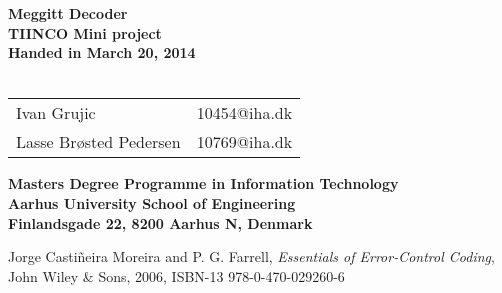 \documentclass[a4paper,10pt]{report}
\begin{document}

\begin{titlepage}
\begin{center}
{\LARGE \textbf{Meggitt Decoder}}\\
{\large \textbf{TIINCO Mini project}}\\

\vspace{4cm}
\textbf{Handed in March 20, 2014}\\~\\ 
\begin{tabular}{ll}
Ivan Grujic & 10454@iha.dk \\
Lasse Brøsted Pedersen & 10769@iha.dk \\
\end{tabular}
\vfill
\textbf{Masters Degree Programme in Information Technology}\\
\textbf{Aarhus University School of Engineering}\\
\textbf{Finlandsgade 22, 8200 Aarhus N, Denmark}
\end{center}
\end{titlepage}

\setcounter{tocdepth}{1}
\tableofcontents

\listoffixmes









\begin{thebibliography}{9}

Jorge Castiñeira Moreira and P. G. Farrell, \emph{Essentials of Error-Control Coding}, John Wiley \& Sons, 2006,
ISBN-13 978-0-470-029260-6


\end{thebibliography}
\end{document}
